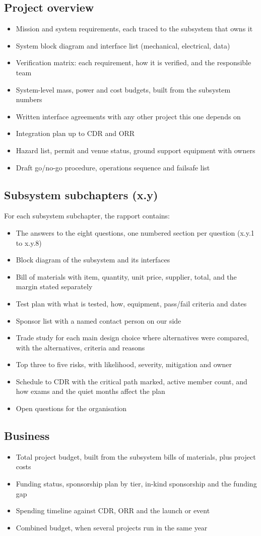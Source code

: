 \documentclass{../../Common/Latex/Templates/rapport}
\renewcommand{\vsubsection}[1]{\subsection{#1}}
\begin{document}
\vsubsection{Project overview}
\begin{itemize}
  \item Mission and system requirements, each traced to the subsystem that owns it
  \item System block diagram and interface list (mechanical, electrical, data)
  \item Verification matrix: each requirement, how it is verified, and the responsible team
  \item System-level mass, power and cost budgets, built from the subsystem numbers
  \item Written interface agreements with any other project this one depends on
  \item Integration plan up to CDR and ORR
  \item Hazard list, permit and venue status, ground support equipment with owners
  \item Draft go/no-go procedure, operations sequence and failsafe list
\end{itemize}

\vsubsection{Subsystem subchapters (x.y)}
For each subsystem subchapter, the rapport contains:
\begin{itemize}
  \item The answers to the eight questions, one numbered section per question (x.y.1 to x.y.8)
  \item Block diagram of the subsystem and its interfaces
  \item Bill of materials with item, quantity, unit price, supplier, total, and the margin stated separately
  \item Test plan with what is tested, how, equipment, pass/fail criteria and dates
  \item Sponsor list with a named contact person on our side
  \item Trade study for each main design choice where alternatives were compared, with the alternatives, criteria and reasons
  \item Top three to five risks, with likelihood, severity, mitigation and owner
  \item Schedule to CDR with the critical path marked, active member count, and how exams and the quiet months affect the plan
  \item Open questions for the organisation
\end{itemize}

\vsubsection{Business}
\begin{itemize}
  \item Total project budget, built from the subsystem bills of materials, plus project costs
  \item Funding status, sponsorship plan by tier, in-kind sponsorship and the funding gap
  \item Spending timeline against CDR, ORR and the launch or event
  \item Combined budget, when several projects run in the same year
\end{itemize}
\end{document}
